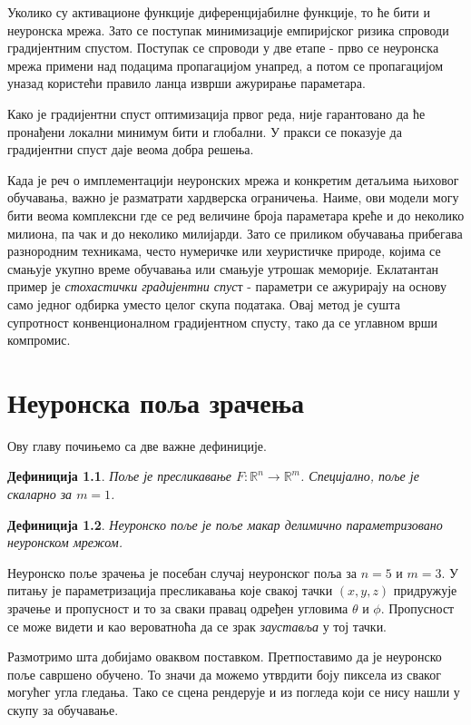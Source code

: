 \documentclass[12pt, a4paper, twoside]{book}
\numberwithin{equation}{chapter}
\numberwithin{theorem}{section}
\numberwithin{definition}{section}
\newtheorem{definitionChapter}{Дефиниција}
\numberwithin{definitionChapter}{chapter}
\begin{document}
Уколико су активационе функције диференцијабилне функције, то ће бити и неуронска мрежа. Зато се
поступак минимизације емпиријског ризика спроводи градијентним спустом. Поступак се спроводи у
две етапе - прво се неуронска мрежа примени над подацима пропагацијом унапред, а потом се
пропагацијом уназад користећи правило ланца изврши ажурирање параметара.

Како је градијентни спуст
оптимизација првог реда, није гарантовано да ће пронађени локални минимум бити и глобални. У пракси
се показује да градијентни спуст даје веома добра решења.

Када је реч о имплементацији неуронских мрежа и конкретим детаљима њиховог обучавања, важно је
разматрати хардверска ограничења. Наиме, ови модели могу бити веома комплексни где се ред величине
броја параметара креће и до неколико милиона, па чак и до неколико милијарди. Зато се приликом
обучавања прибегава разнородним техникама, често нумеричке или хеуристичке природе, којима се
смањује укупно време обучавања или смањује утрошак меморије. Еклатантан пример је \textit{стохастички
градијентни спус}т \cite{sgd} - параметри се ажурирају на основу само једног одбирка уместо целог
скупа података. Овај метод је сушта супротност конвенционалном градијентном спусту, тако да се
углавном врши компромис.

\chapter{Неуронска поља зрачења}
Ову главу почињемо са две важне дефиниције.

	\begin{definitionChapter}
		Поље је пресликавање $F:\mathbb{R}^n \rightarrow \mathbb{R}^m$. Специјално, поље је скаларно
		за $m=1$.
	\end{definitionChapter}

	\begin{definitionChapter}
		Неуронско поље је поље макар делимично параметризовано неуронском мрежом.
	\end{definitionChapter}

	Неуронско поље зрачења је посебан случај неуронског поља за $n=5$ и $m=3$. У питању је параметризација
	пресликавања које свакој тачки $(x, y, z)$ придружује зрачење и пропусност и то за сваки правац
	одређен угловима $\theta$ и $\phi$. Пропусност се може видети и као вероватноћа да се зрак
	\textit{зауставља} у тој тачки.
	
	Размотримо шта добијамо оваквом поставком. Претпоставимо да је неуронско поље савршено обучено. То значи
	да можемо утврдити боју пиксела из сваког могућег угла гледања. Тако се сцена рендерује и из погледа
	који се нису нашли у скупу за обучавање.
\end{document}
